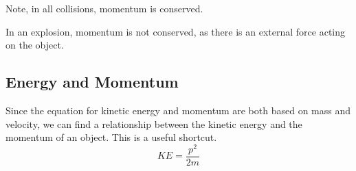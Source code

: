 \documentclass[../notes.tex]{subfiles}
\begin{document}
Note, in all collisions, momentum is conserved.

In an explosion, momentum is not conserved, as there is an external force acting on the object.

\subsection{Energy and Momentum}
Since the equation for kinetic energy and momentum are both based on mass and velocity, we can find a relationship between the kinetic energy and the momentum of an object.
This is a useful shortcut.
\begin{equation}
	KE = \frac{p^2}{2m}
\end{equation}
\end{document}
